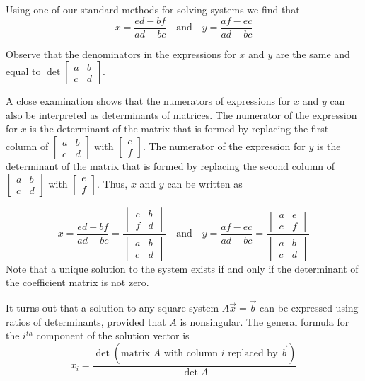 \documentclass{ximera}
\begin{document}
 Using one of our standard methods for solving systems we find that 
 $$x=\frac{ed-bf}{ad-bc}\quad\text{and}\quad y=\frac{af-ec}{ad-bc}$$
 
 Observe that the denominators in the expressions for $x$ and $y$ are the same and equal to $\det{\begin{bmatrix}a&b\\c&d\end{bmatrix}}$.
 
 A close examination shows that the numerators of expressions for $x$ and $y$ can also be interpreted as determinants of matrices. The numerator of the expression for $x$ is the determinant of the matrix that is formed by replacing the first column of $\begin{bmatrix}a&b\\c&d\end{bmatrix}$ with $\begin{bmatrix}e\\f\end{bmatrix}$.  The numerator of the expression for $y$ is the determinant of the matrix that is formed by replacing the second column of $\begin{bmatrix}a&b\\c&d\end{bmatrix}$ with $\begin{bmatrix}e\\f\end{bmatrix}$.  Thus, $x$ and $y$ can be written as
 
 $$x=\frac{ed-bf}{ad-bc}=\frac{\begin{vmatrix}e&b\\f&d\end{vmatrix}}{\begin{vmatrix}a&b\\c&d\end{vmatrix}}\quad\text{and}\quad y=\frac{af-ec}{ad-bc}=\frac{\begin{vmatrix}a&e\\c&f\end{vmatrix}}{\begin{vmatrix}a&b\\c&d\end{vmatrix}}$$
Note that a unique solution to the system exists if and only if the determinant of the coefficient matrix is not zero.

It turns out that a solution to any square system $A\vec{x}=\vec{b}$ can be expressed using ratios of determinants, provided that $A$ is nonsingular.  The general formula for the $i^{th}$ component of the solution vector is
$$x_i=\frac{\det{(\text{matrix } A \text{ with column } i \text{ replaced by } \vec{b})}}{\det{A}}$$
\end{document}

